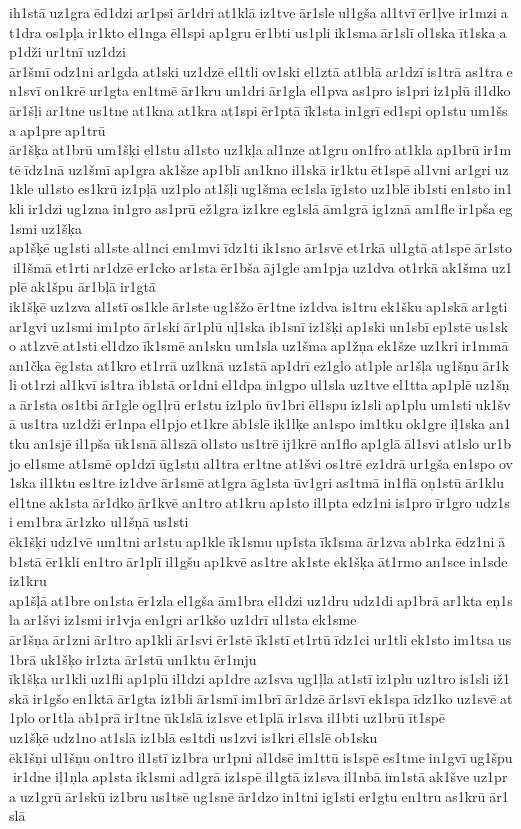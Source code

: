 ih1stā uz1gra ēd1dzi ar1psi ār1dri at1klā iz1tve ār1sle ul1gša al1tvī ēr1ļve ir1mzi at1dra os1pļa ir1kto el1nga ēl1spi ap1gru ēr1bti us1pli ik1sma ār1slī ol1ska īt1ska ap1dži ur1tnī uz1dzi 	ār1šmī odz1ni ar1gda at1ski uz1dzē el1tli ov1ski el1ztā at1blā ar1dzī is1trā as1tra en1svī on1krē ur1gta en1tmē ār1kru un1dri ār1gla el1pva as1pro is1pri iz1plū il1dko 	ār1šļi ar1tne us1tne at1kna at1kra at1spi ēr1ptā īk1sta in1grī ed1spi op1stu um1šsa ap1pre ap1trū 	ār1šķa at1brū um1šķi el1stu al1sto uz1kļa al1nze at1gru on1fro at1kla ap1brū ir1mtē īdz1nā uz1šmī ap1gra ak1šze ap1blī an1kno il1skā ir1ktu ēt1spē al1vni ar1gri uz1kle ul1sto es1krū iz1pļā uz1plo at1šļi ug1šma ec1sla īg1sto uz1blē ib1sti en1sto in1kli ir1dzi ug1zna in1gro as1prū ež1gra iz1kre eg1slā ām1grā ig1znā am1fle ir1pša eg1smi uz1šķa 	ap1šķē ug1sti al1ste al1nci em1mvi īdz1ti ik1sno ār1svē et1rkā ul1gtā at1spē ār1sto il1šmā et1rti ar1dzē er1cko ar1sta ēr1bša āj1gle am1pja uz1dva ot1rkā ak1šma uz1plē ak1špu 	ār1bļā ir1gtā 	ik1šķē uz1zva al1stī os1kle ār1ste ug1šžo ēr1tne iz1dva is1tru ek1šku ap1skā ar1gti ar1gvi uz1smi im1pto ār1ski ār1plū uļ1ska ib1snī iz1šķi ap1ski un1sbī ep1stē us1sko at1zvē at1sti el1dzo īk1smē an1sku um1sla uz1šma ap1žņa ek1šze uz1kri ir1mmā an1čka ēg1sta at1kro et1rrā uz1knā uz1stā ap1drī ez1glo at1ple ar1šļa ug1šņu ār1kli ot1rzi al1kvī is1tra ib1stā or1dni el1dpa in1gpo ul1sla uz1tve el1tta ap1plē uz1šņa ār1sta os1tbi ār1gle og1ļrū er1stu iz1plo ūv1bri ēl1spu iz1sli ap1plu um1sti uk1švā us1tra uz1dži ēr1npa el1pjo et1kre āb1slē ik1lķe an1spo im1tku ok1gre iļ1ska an1tku an1sjē il1pša ūk1snā āl1szā ol1sto us1trē ij1krē an1flo ap1glā āl1svi at1slo ur1bjo el1sme at1smē op1dzī ūg1stu al1tra er1tne at1švi os1trē ez1drā ur1gša en1spo ov1ska il1ktu es1tre iz1dve ār1smē at1gra āg1sta ūv1gri as1tmā in1flā oņ1stū ār1klu el1tne ak1sta ār1dko ār1kvē an1tro at1kru ap1sto il1pta edz1ni is1pro īr1gro udz1si em1bra ār1zko 	ul1šņā us1sti 	ēk1šķi udz1vē um1tni ar1stu ap1kle īk1smu up1sta īk1sma ār1zva ab1rka ēdz1ni āb1stā ēr1kli en1tro ār1plī il1gšu ap1kvē as1tre ak1ste ek1šķa āt1rmo an1sce in1sde iz1kru 	ap1šļā at1bre on1sta ēr1zla el1gša ām1bra el1dzi uz1dru udz1di ap1brā ar1kta eņ1sla ar1švi iz1smi ir1vja en1gri ar1kšo uz1drī ul1sta ek1sme 	ār1šņa ār1zni ār1tro ap1kli ār1svi ēr1stē īk1stī et1rtū īdz1ci ur1tli ek1sto im1tsa us1brā uk1šķo ir1zta ār1stū un1ktu ēr1mju 	īk1šķa ur1kli uz1fli ap1plū il1dzi ap1dre az1sva ug1ļla at1stī iz1plu uz1tro is1sli iž1skā ir1gšo en1ktā ār1gta iz1bli ār1smī im1brī ār1dzē ār1svī ek1spa īdz1ko uz1svē at1plo or1tla ab1prā ir1tne ūk1slā iz1sve et1plā ir1sva il1bti uz1brū īt1spē 	uz1šķē udz1no at1slā iz1blā es1tdi us1zvi is1kri ēl1slē ob1sku 	ēk1šņi ul1šņu on1tro il1stī iz1bra ur1pni al1dsē im1ttū is1spē es1tme in1gvī ug1špu ir1dne iļ1ņla ap1sta ik1smi ad1grā iz1spē il1gtā iz1sva il1nbā im1stā ak1šve uz1pra uz1grū ār1skū iz1bru us1tsē ug1snē ār1dzo in1tni ig1sti er1gtu en1tru as1krū ār1slā 